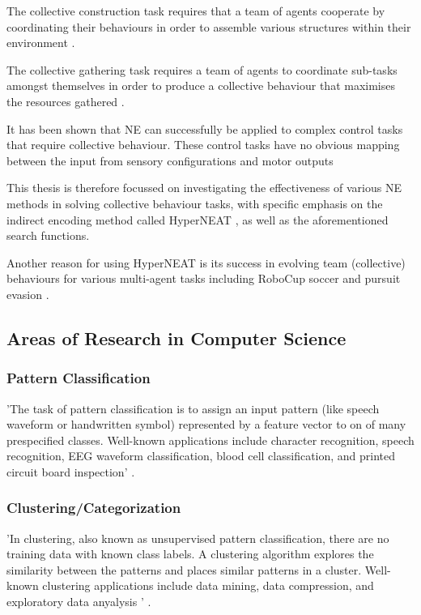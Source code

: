 The collective construction task requires that a team of agents cooperate by coordinating their behaviours in order to assemble various structures within their environment \cite{RefWorks:15}.

The collective gathering task requires a team of agents to coordinate sub-tasks amongst themselves in order to produce a collective behaviour that maximises the resources gathered \cite{RefWorks:15}.

It has been shown that NE can successfully be applied to complex control tasks that require collective behaviour. These control tasks have no obvious mapping between the input from sensory configurations and motor outputs \cite{RefWorks:15}



This thesis is therefore focussed on investigating the effectiveness of various NE methods in solving collective behaviour tasks, with specific emphasis on the indirect encoding method called HyperNEAT \cite{stanley2009hypercube}, as well as the aforementioned search functions.


Another reason for using HyperNEAT is its success in evolving team (collective) behaviours for various multi-agent tasks including RoboCup soccer and pursuit evasion \cite{hausknecht2012hyperneat}.


\subsection{Areas of Research in Computer Science}

\subsubsection{Pattern Classification}
'The task of pattern classification is to assign an input pattern (like speech waveform or handwritten symbol) represented by a feature vector to on of many prespecified classes. Well-known applications include character recognition, speech recognition, EEG waveform classification, blood cell classification, and printed circuit board inspection' \cite{jain1996artificial}.

\subsubsection{Clustering/Categorization}
'In clustering, also known as unsupervised pattern classification, there are no training data with known class labels. A clustering algorithm explores the similarity between the patterns and places similar patterns in a cluster. Well-known clustering applications include data mining, data compression, and exploratory data anyalysis ' \cite{jain1996artificial}.

